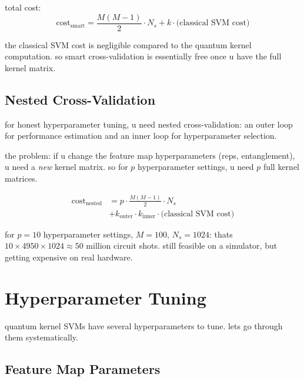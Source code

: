 \documentclass[11pt,a4paper]{article}
\theoremstyle{definition}
\theoremstyle{remark}
\begin{document}
total cost:
\[
\text{cost}_{\text{smart}} = \frac{M(M-1)}{2} \cdot N_s + k \cdot \text{(classical SVM cost)}
\]

the classical SVM cost is negligible compared to the quantum kernel computation. so smart cross-validation is essentially free once u have the full kernel matrix.

\subsection{Nested Cross-Validation}

for honest hyperparameter tuning, u need nested cross-validation: an outer loop for performance estimation and an inner loop for hyperparameter selection.

the problem: if u change the feature map hyperparameters (reps, entanglement), u need a \emph{new} kernel matrix. so for $p$ hyperparameter settings, u need $p$ full kernel matrices.

\begin{align}
\text{cost}_{\text{nested}} &= p \cdot \frac{M(M-1)}{2} \cdot N_s \\
&+ k_{\text{outer}} \cdot k_{\text{inner}} \cdot \text{(classical SVM cost)}
\end{align}

for $p = 10$ hyperparameter settings, $M = 100$, $N_s = 1024$: thats $10 \times 4950 \times 1024 \approx 50$ million circuit shots. still feasible on a simulator, but getting expensive on real hardware.

\section{Hyperparameter Tuning}

quantum kernel SVMs have several hyperparameters to tune. lets go through them systematically.

\subsection{Feature Map Parameters}
\end{document}
